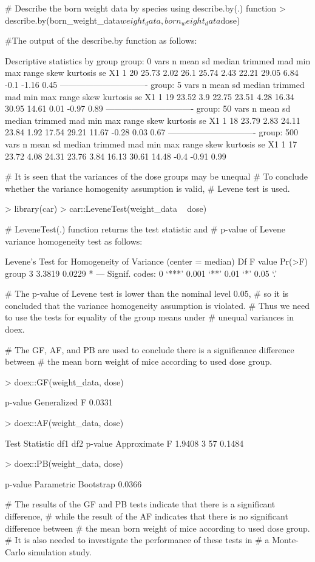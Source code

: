 \begin{example}
# Describe the born weight data by species using describe.by(.) function
> describe.by(born_weight_data$weight_data, born_weight_data$dose)

#The output of the describe.by function as follows:

 Descriptive statistics by group 
group: 0
   vars  n  mean   sd median trimmed  mad   min   max range skew kurtosis   se
X1    1 20 25.73 2.02   26.1   25.74 2.43 22.21 29.05  6.84 -0.1    -1.16 0.45
------------------------------- 
group: 5
   vars  n  mean  sd median trimmed  mad   min   max range skew kurtosis   se
X1    1 19 23.52 3.9  22.75   23.51 4.28 16.34 30.95 14.61 0.01    -0.97 0.89
------------------------------- 
group: 50
   vars  n  mean   sd median trimmed  mad   min   max range  skew kurtosis   se
X1    1 18 23.79 2.83  24.11   23.84 1.92 17.54 29.21 11.67 -0.28     0.03 0.67
------------------------------- 
group: 500
   vars  n  mean   sd median trimmed  mad   min   max range skew kurtosis   se
X1    1 17 23.72 4.08  24.31   23.76 3.84 16.13 30.61 14.48 -0.4    -0.91 0.99

# It is seen that the variances of the dose groups may be unequal
# To conclude whether the variance homogenity assumption is valid, 
# Levene test is used. 

> library(car)
> car::LeveneTest(weight_data ~ dose)

# LeveneTest(.) function returns the test statistic and 
# p-value of Levene variance homogeneity test as follows:

Levene's Test for Homogeneity of Variance (center = median)
      Df F value Pr(>F)  
group  3  3.3819 0.0229 *
---
Signif. codes:  
  0 ‘***’ 0.001 ‘**’ 0.01 ‘*’ 0.05 ‘.’ 

# The p-value of Levene test is lower than the nominal level 0.05, 
# so it is concluded that the variance homogeneity assumption is violated. 
# Thus we need to use the tests for equality of the group means under 
# unequal variances in doex.

# The GF, AF, and PB are used to conclude there is a significance difference between 
# the mean born weight of mice according to used dose group.

> doex::GF(weight_data, dose)

              p-value
Generalized F  0.0331

> doex::AF(weight_data, dose)

              Test Statistic df1 df2 p-value
Approximate F         1.9408   3  57  0.1484

> doex::PB(weight_data, dose)

                     p-value
Parametric Bootstrap  0.0366

# The results of the GF and PB tests indicate that there is a significant difference,
# while the result of the AF indicates that there is no significant difference between
# the mean born weight of mice according to used dose group.
# It is also needed to investigate the performance of these tests in 
# a Monte-Carlo simulation study.
\end{example}


